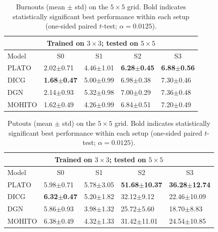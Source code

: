 \begin{table}[t]
\centering
\small
\setlength{\tabcolsep}{2.5pt}
\renewcommand{\arraystretch}{1.03}
\begin{tabular}{l|l|l|l|l}
\toprule
\multicolumn{5}{c}{Trained on $3\times 3$; tested on $5\times 5$} \\
\midrule
Model & \multicolumn{1}{c|}{S0} & \multicolumn{1}{c|}{S1} & \multicolumn{1}{c|}{S2} & \multicolumn{1}{c}{S3} \\
\midrule
PLATO & 2.02$\pm$0.71 & 4.46$\pm$1.01 & \textbf{6.28$\pm$0.45} & \textbf{6.88$\pm$0.56} \\
DICG & \textbf{1.68$\pm$0.47} & 5.00$\pm$0.99 & 6.98$\pm$0.38 & 7.30$\pm$0.46 \\
DGN & 2.14$\pm$0.93 & 5.32$\pm$0.98 & 7.00$\pm$0.29 & 7.36$\pm$0.48 \\
MOHITO  & 1.62$\pm$0.49 & 4.26$\pm$0.99 & 6.84$\pm$0.51 & 7.20$\pm$0.49 \\
\bottomrule
\end{tabular}
\caption{Burnouts (mean $\pm$ std) on the $5\times 5$ grid. Bold indicates statistically significant best performance within each setup (one-sided paired $t$-test; $\alpha=0.0125$).}
\label{tab:zs_burnouts_5x5_from_3x3}
\end{table}




\begin{table}[t]
\centering
\small
\setlength{\tabcolsep}{2.5pt}
\renewcommand{\arraystretch}{1.03}
\begin{tabular}{l|l|l|l|l}
\toprule
\multicolumn{5}{c}{Trained on $3\times 3$; tested on $5\times 5$} \\
\midrule
Model & \multicolumn{1}{c|}{S0} & \multicolumn{1}{c|}{S1} & \multicolumn{1}{c|}{S2} & \multicolumn{1}{c}{S3} \\
\midrule
PLATO & 5.98$\pm$0.71 & 5.78$\pm$3.05 & \textbf{51.68$\pm$10.37} & \textbf{36.28$\pm$12.74} \\
DICG & \textbf{6.32$\pm$0.47} & 5.20$\pm$1.82 & 32.12$\pm$9.12 & 22.46$\pm$10.09 \\
DGN & 5.86$\pm$0.93 & 3.98$\pm$1.32 & 25.72$\pm$5.60 & 18.70$\pm$8.83 \\
MOHITO  & 6.38$\pm$0.49 & 4.32$\pm$1.33 & 31.42$\pm$11.01 & 24.54$\pm$10.85 \\
\bottomrule
\end{tabular}
\caption{Putouts (mean $\pm$ std) on the $5\times 5$ grid. Bold indicates statistically significant best performance within each setup (one-sided paired $t$-test; $\alpha=0.0125$).}
\label{tab:zs_putouts_5x5_from_3x3}
\end{table}


